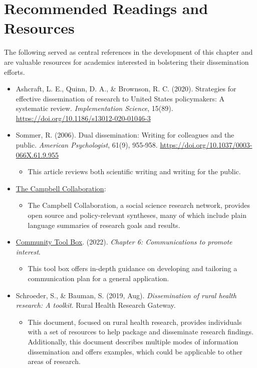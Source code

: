 \documentclass[
  11pt,
]{book}
\providecommand{\tightlist}{%
  \setlength{\itemsep}{0pt}\setlength{\parskip}{0pt}}
\begin{document}
\section{Recommended Readings and Resources}\label{recommended-readings-and-resources-3}

The following served as central references in the development of this chapter and are valuable resources for academics interested in bolstering their dissemination efforts.

\begin{itemize}
\tightlist
\item
  Ashcraft, L. E., Quinn, D. A., \& Brownson, R. C. (2020). Strategies for effective dissemination of research to United States policymakers: A systematic review. \emph{Implementation Science}, 15(89). \url{https://doi.org/10.1186/s13012-020-01046-3}
\item
  Sommer, R. (2006). Dual dissemination: Writing for colleagues and the public. \emph{American Psychologist}, 61(9), 955-958. \url{https://doi.org/10.1037/0003-066X.61.9.955}

  \begin{itemize}
  \tightlist
  \item
    This article reviews both scientific writing and writing for the public.
  \end{itemize}
\item
  \href{https://www.campbellcollaboration.org}{The Campbell Collaboration}:

  \begin{itemize}
  \tightlist
  \item
    The Campbell Collaboration, a social science research network, provides open source and policy-relevant syntheses, many of which include plain language summaries of research goals and results.
  \end{itemize}
\item
  \href{https://ctb.ku.edu/en/table-of-contents/participation/promoting-interest}{Community Tool Box}. (2022). \emph{Chapter 6: Communications to promote interest}.

  \begin{itemize}
  \tightlist
  \item
    This tool box offers in-depth guidance on developing and tailoring a communication plan for a general application.
  \end{itemize}
\item
  Schroeder, S., \& Bauman, S. (2019, Aug). \emph{Dissemination of rural health research: A toolkit}. Rural Health Research Gateway.

  \begin{itemize}
  \tightlist
  \item
    This document, focused on rural health research, provides individuals with a set of resources to help package and disseminate research findings. Additionally, this document describes multiple modes of information dissemination and offers examples, which could be applicable to other areas of research.
  \end{itemize}
\end{itemize}
\end{document}
